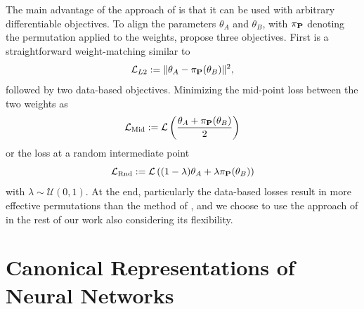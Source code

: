 The main advantage of the approach of \citet{penaReBasinImplicitSinkhorn2023} is that it can be used with arbitrary differentiable objectives. To align the parameters $\theta_A$ and $\theta_B$, with $\pi_{\mathbf{P}}$ denoting the permutation applied to the weights, \citet{penaReBasinImplicitSinkhorn2023} propose three objectives. First is a straightforward weight-matching similar to \citep{ainsworthGitReBasinMerging2023}
\begin{equation}
    \mathcal{L}_{L2} := \Vert \theta_A - \pi_{\mathbf{P}} (\theta_B) \Vert^2,
\end{equation}
followed by two data-based objectives. Minimizing the mid-point loss between the two weights as
\begin{equation}
    \mathcal{L}_{\text{Mid}} := \mathcal{L} \left( \frac{\theta_A + \pi_{\mathbf{P}} (\theta_B)}{2} \right) 
\end{equation}
or the loss at a random intermediate point 
\begin{equation}
    \mathcal{L}_{\text{Rnd}} := \mathcal{L} \left( (1-\lambda)\theta_A + \lambda \pi_{\mathbf{P}} (\theta_B) \right) 
\end{equation}
with $\lambda \sim \mathcal{U}(0,1)$. At the end, particularly the data-based losses result in more effective permutations than the method of \citep{ainsworthGitReBasinMerging2023}, and we choose to use the approach of \citet{penaReBasinImplicitSinkhorn2023} in the rest of our work also considering its flexibility. 

\section{Canonical Representations of Neural Networks}

